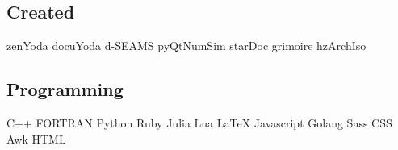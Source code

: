 \documentclass[letterpaper]{deedy-resume} %
\begin{document}
\begin{minipage}[t]{0.36\textwidth}
	\subsection{Created}
	zenYoda \textbullet{} docuYoda \textbullet{} d-SEAMS \textbullet{} pyQtNumSim \textbullet{} starDoc \textbullet{} grimoire \textbullet{} hzArchIso\\
	\subsection{Programming}
	C++\textbullet{} FORTRAN\textbullet{} Python\textbullet{} Ruby \textbullet{} Julia \textbullet{} Lua \textbullet{} LaTeX \textbullet{} Javascript \textbullet{} Golang \textbullet{} Sass \textbullet{} CSS \textbullet{}Awk \textbullet{} HTML

\end{minipage} %
\hfill
%
%
\end{document}

